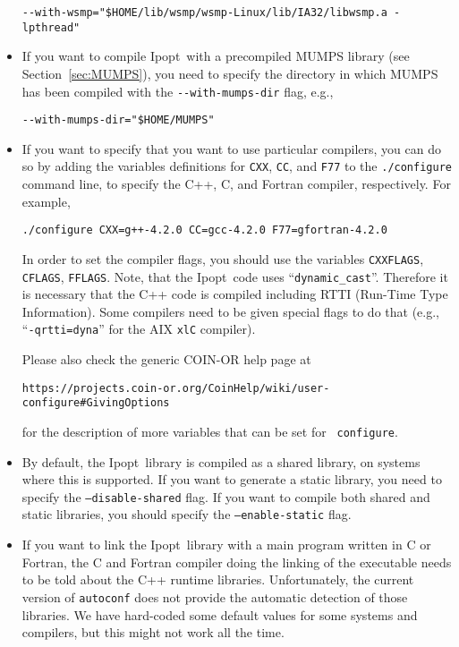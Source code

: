 \documentclass[10pt]{article}
\newcommand{\Ipopt}{{\sc Ipopt}}
\begin{document}
\begin{itemize}
  \verb|--with-wsmp="$HOME/lib/wsmp/wsmp-Linux/lib/IA32/libwsmp.a -lpthread"|

\item If you want to compile \Ipopt\ with a precompiled MUMPS library
  (see Section~\ref{sec:MUMPS}), you need to specify the directory in
  which MUMPS has been compiled with the \verb|--with-mumps-dir| flag,
  e.g.,

  \verb|--with-mumps-dir="$HOME/MUMPS"|

\item If you want to specify that you want to use particular
  compilers, you can do so by adding the variables definitions for
  {\tt CXX}, {\tt CC}, and {\tt F77} to the {\tt ./configure} command
  line, to specify the C++, C, and Fortran compiler, respectively.
  For example,

  {\tt ./configure CXX=g++-4.2.0 CC=gcc-4.2.0 F77=gfortran-4.2.0}

  In order to set the compiler flags, you should use the variables
  {\tt CXXFLAGS}, {\tt CFLAGS}, {\tt FFLAGS}.  Note, that the \Ipopt\
  code uses ``{\tt dynamic\_cast}''.  Therefore it is necessary that
  the C++ code is compiled including RTTI (Run-Time Type Information).
  Some compilers need to be given special flags to do that (e.g.,
  ``{\tt -qrtti=dyna}'' for the AIX {\tt xlC} compiler).

  Please also check the generic COIN-OR help page at

  \centerline{\tt https://projects.coin-or.org/CoinHelp/wiki/user-configure\#GivingOptions}

  for the description of more variables that can be set for {\tt
    configure}.

\item By default, the \Ipopt\ library is compiled as a shared library,
  on systems where this is supported.  If you want to generate a
  static library, you need to specify the {\tt --disable-shared}
  flag.  If you want to compile both shared and static libraries, you
  should specify the {\tt --enable-static} flag.

\item If you want to link the \Ipopt\ library with a main program
  written in C or Fortran, the C and Fortran compiler doing the
  linking of the executable needs to be told about the C++ runtime
  libraries.  Unfortunately, the current version of {\tt autoconf}
  does not provide the automatic detection of those libraries.  We
  have hard-coded some default values for some systems and compilers,
  but this might not work all the time.


\end{itemize}
\end{document}
